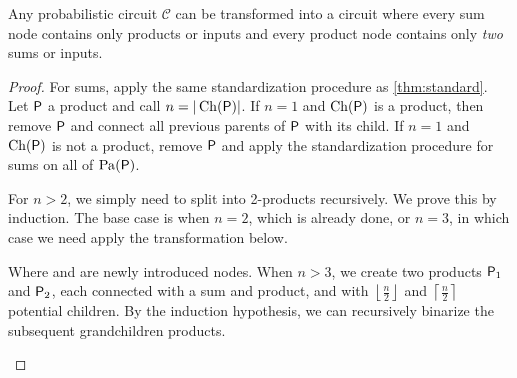 \begin{theorem}[2-Standardization]
\label{thm:2standard}
Any probabilistic circuit $\mathcal{C}$ can be transformed into a circuit where every sum node
contains only products or inputs and every product node contains only \emph{two} sums or inputs.
\end{theorem}
\begin{proof}
  For sums, apply the same standardization procedure as \cref{thm:standard}. Let $\operatorname{\textup{\textsf{P}}}$ a product
  and call $n=|\operatorname*{\normalfont{Ch}}(\operatorname{\textup{\textsf{P}}})|$. If $n=1$ and $\operatorname*{\normalfont{Ch}}(\operatorname{\textup{\textsf{P}}})$ is a product, then remove $\operatorname{\textup{\textsf{P}}}$ and
  connect all previous parents of $\operatorname{\textup{\textsf{P}}}$ with its child. If $n=1$ and $\operatorname*{\normalfont{Ch}}(\operatorname{\textup{\textsf{P}}})$ is not a
  product, remove $\operatorname{\textup{\textsf{P}}}$ and apply the standardization procedure for sums on all of $\operatorname*{\normalfont{Pa}}(\operatorname{\textup{\textsf{P}}})$.

  For $n>2$, we simply need to split into 2-products recursively. We prove this by induction. The
  base case is when $n=2$, which is already done, or $n=3$, in which case we need apply the
  transformation below.
  \begin{center}
  \end{center}
  Where \inode[fill=boxorange!80]{\newSumNode} and \inode[fill=boxgoldenrod!70]{\newProdNode} are
  newly introduced nodes. When $n>3$, we create two products $\operatorname{\textup{\textsf{P}}}_1$ and $\operatorname{\textup{\textsf{P}}}_2$, each
  connected with a sum and product, and with $\left\lfloor\frac{n}{2}\right\rfloor$ and
  $\left\lceil\frac{n}{2}\right\rceil$ potential children. By the induction hypothesis, we can
  recursively binarize the subsequent grandchildren products.
  \begin{center}
\end{center}
\end{proof}
